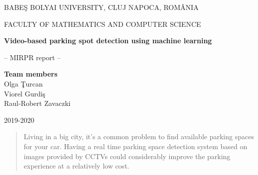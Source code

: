 \documentclass[runningheads,a4paper,11pt]{report}
\begin{document}
\begin{titlepage}
\sloppy
\begin{center}
BABE\c S BOLYAI UNIVERSITY, CLUJ NAPOCA, ROM\^ ANIA

FACULTY OF MATHEMATICS AND COMPUTER SCIENCE

\vspace{6cm}

\Huge \textbf{Video-based parking spot detection using machine learning}

\vspace{1cm}

\normalsize -- MIRPR report --

\end{center}


\vspace{5cm}

\begin{flushright}
  \Large{\textbf{Team members}}\\
  \normalsize Olga \c Turcan \\
  \normalsize Viorel Gurdi\c s \\
  \normalsize Raul-Robert Zavaczki
\end{flushright}

\vspace{4cm}

\begin{center}
2019-2020
\end{center}

\end{titlepage}


\begin{abstract}
	Living in a big city, it's a common problem to find available parking 
  spaces for your car. Having a real time parking space 
  detection system based on images provided by CCTVs could considerably 
  improve the parking experience at a relatively low cost.
\end{abstract}


\tableofcontents

\newpage

\listoftables
\listoffigures

\newpage




\newpage



 
\end{document}
